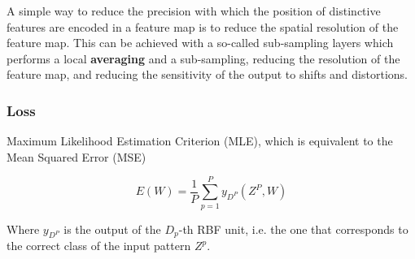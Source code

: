 \documentclass[11pt]{article}
\begin{document}
A simple way to reduce the precision with which the position of distinctive features are encoded in a feature map is to reduce the spatial resolution of the feature map. This can be achieved with a so-called sub-sampling layers which performs a local \textbf{averaging} and a sub-sampling, reducing the resolution of the feature map, and reducing the sensitivity of the output to shifts and distortions.

\subsubsection{Loss}

Maximum Likelihood Estimation Criterion (MLE), which is equivalent to the Mean Squared Error (MSE)

\begin{equation*}
    E(W) = \frac 1 P \sum ^ P _{ p = 1} y_{D^P} (Z^P, W)
\end{equation*}

Where $y_{D^P}$ is the output of the $D_p$-th RBF unit, i.e. the one that corresponds to the correct class of the input pattern $Z^p$. 


\end{document}
